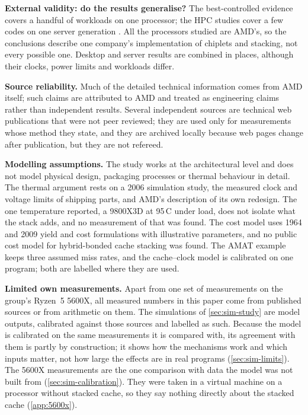 \textbf{External validity: do the results generalise?} The best-controlled evidence covers a handful of workloads on one processor; the HPC studies cover a few codes on one server generation \cite{domkeLocusPerformanceQuantifying2023,lawendaEvaluatingImpactL32025}. All the processors studied are AMD's, so the conclusions describe one company's implementation of chiplets and stacking, not every possible one. Desktop and server results are combined in places, although their clocks, power limits and workloads differ.

\textbf{Source reliability.} Much of the detailed technical information comes from AMD itself; such claims are attributed to AMD and treated as engineering claims rather than independent results. Several independent sources are technical web publications that were not peer reviewed; they are used only for measurements whose method they state, and they are archived locally because web pages change after publication, but they are not refereed.

\textbf{Modelling assumptions.} The study works at the architectural level and does not model physical design, packaging processes or thermal behaviour in detail. The thermal argument rests on a 2006 simulation study, the measured clock and voltage limits of shipping parts, and AMD's description of its own redesign. The one temperature reported, a 9800X3D at 95\,\textdegree C under load, does not isolate what the stack adds, and no measurement of that was found. The cost model uses 1964 and 2009 yield and cost formulations with illustrative parameters, and no public cost model for hybrid-bonded cache stacking was found. The AMAT example keeps three assumed miss rates, and the cache--clock model is calibrated on one program; both are labelled where they are used.

\textbf{Limited own measurements.} Apart from one set of measurements on the group's Ryzen~5 5600X, all measured numbers in this paper come from published sources or from arithmetic on them. The simulations of \cref{sec:sim-study} are model outputs, calibrated against those sources and labelled as such. Because the model is calibrated on the same measurements it is compared with, its agreement with them is partly by construction; it shows how the mechanisms work and which inputs matter, not how large the effects are in real programs (\cref{sec:sim-limits}). The 5600X measurements are the one comparison with data the model was not built from (\cref{sec:sim-calibration}). They were taken in a virtual machine on a processor without stacked cache, so they say nothing directly about the stacked cache (\cref{app:5600x}).

